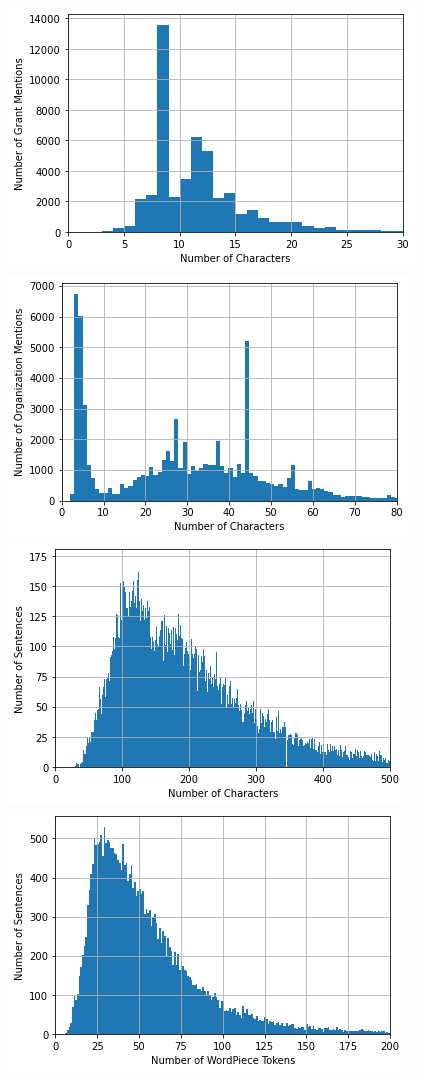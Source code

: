 \documentclass{report}
\theoremstyle{definition}
\theoremstyle{remark}
\begin{document}
\begin{figure}
    \centering
    \includegraphics[scale=0.45]{grant_lens.png}
    \includegraphics[scale=0.45]{org_lens.png}
    \includegraphics[scale=0.45]{sentence_lens.png}
    \includegraphics[scale=0.45]{sentence_tokens.png}

\end{figure}
\end{document}
